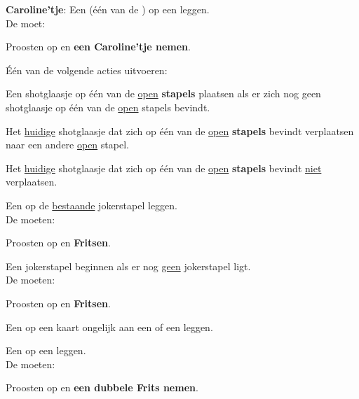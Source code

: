 \vervolgLijstKlein{}
\item \textbf{Caroline'tje}: Een  (\'e\'en van de ) op een  leggen. \\De \huidigeSpeler moet:
\puntLijst{}
\item Proosten op  en \textbf{een Caroline'tje nemen}\footnotemark[3].
\item Één van de volgende acties uitvoeren:
\numeriekeLijst{}
\item Een shotglaasje op \'e\'en van de \ul{open} \textbf{stapels} plaatsen als er zich nog geen shotglaasje op \'e\'en van de \ul{open} stapels bevindt.
\item Het \ul{huidige} shotglaasje dat zich op \'e\'en van de \ul{open} \textbf{stapels} bevindt verplaatsen naar een andere \ul{open} stapel.
\item Het \ul{huidige} shotglaasje dat zich op \'e\'en van de \ul{open} \textbf{stapels} bevindt \ul{niet} verplaatsen.
\eindNumeriekeLijst{}
\eindPuntLijst{}
\label{zet:caroline}
\eindLijst{}

\vervolgLijstKlein{}
\item \label{zet:joker_1} Een  op de \ul{bestaande} jokerstapel leggen. \\De \andereSpelers moeten:
\puntLijst{}
\item Proosten op  en \textbf{Fritsen}.
\eindPuntLijst{}
\eindLijst{}

\vervolgLijstKlein{}
\item \label{zet:joker_2} Een jokerstapel beginnen als er nog \ul{geen} jokerstapel ligt. \\De \andereSpelers moeten:
\puntLijst{}
\item Proosten op  en \textbf{Fritsen}.
\eindPuntLijst{}
\eindLijst{}

\vervolgLijstKlein{}
\item Een  op een kaart ongelijk aan een  of een  leggen.
\eindLijst{}

\vervolgLijstKlein{}
\item Een  op een  leggen. \\De \andereSpelers moeten:
\puntLijst{}
\item Proosten op  en \textbf{een dubbele Frits nemen}.
\eindPuntLijst{}
\eindLijst{}





